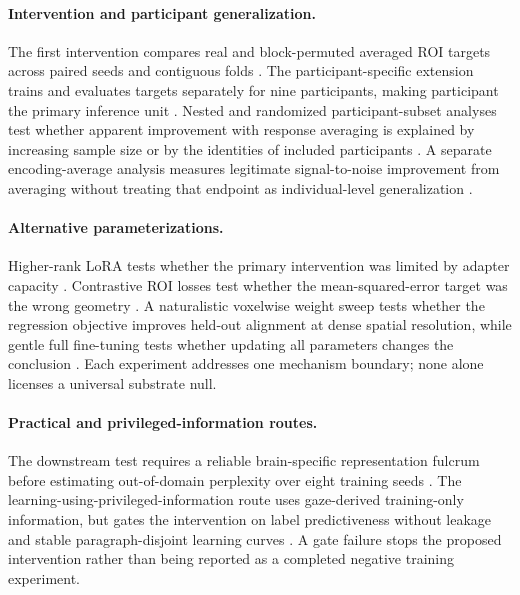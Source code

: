 \paragraph{Intervention and participant generalization.}
The first intervention compares real and block-permuted averaged ROI targets across paired seeds and contiguous folds .
The participant-specific extension trains and evaluates targets separately for nine participants, making participant the primary inference unit .
Nested and randomized participant-subset analyses test whether apparent improvement with response averaging is explained by increasing sample size or by the identities of included participants .
A separate encoding-average analysis measures legitimate signal-to-noise improvement from averaging without treating that endpoint as individual-level generalization .

\paragraph{Alternative parameterizations.}
Higher-rank LoRA tests whether the primary intervention was limited by adapter capacity .
Contrastive ROI losses test whether the mean-squared-error target was the wrong geometry .
A naturalistic voxelwise weight sweep tests whether the regression objective improves held-out alignment at dense spatial resolution, while gentle full fine-tuning tests whether updating all parameters changes the conclusion .
Each experiment addresses one mechanism boundary; none alone licenses a universal substrate null.

\paragraph{Practical and privileged-information routes.}
The downstream test requires a reliable brain-specific representation fulcrum before estimating out-of-domain perplexity over eight training seeds .
The learning-using-privileged-information route uses gaze-derived training-only information, but gates the intervention on label predictiveness without leakage and stable paragraph-disjoint learning curves .
A gate failure stops the proposed intervention rather than being reported as a completed negative training experiment.

